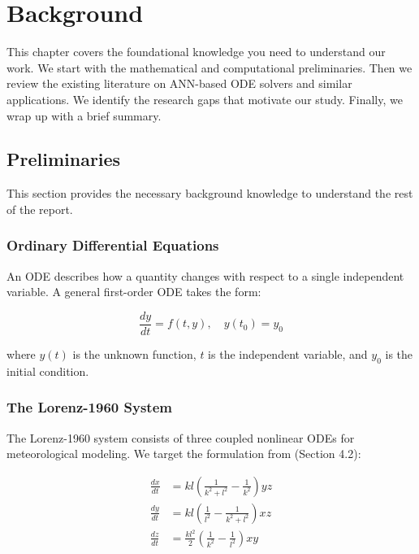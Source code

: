\chapter{Background}

This chapter covers the foundational knowledge you need to understand our work. We start with the mathematical and computational preliminaries. Then we review the existing literature on ANN-based ODE solvers and similar applications. We identify the research gaps that motivate our study. Finally, we wrap up with a brief summary.

\section{Preliminaries}

This section provides the necessary background knowledge to understand the rest of the report.

\subsection{Ordinary Differential Equations}

An ODE describes how a quantity changes with respect to a single independent variable. A general first-order ODE takes the form:

\begin{equation}
\frac{dy}{dt} = f(t, y), \quad y(t_0) = y_0
\label{eq:first_order_ode}
\end{equation}

where $y(t)$ is the unknown function, $t$ is the independent variable, and $y_0$ is the initial condition.

\subsection{The Lorenz-1960 System}

The Lorenz-1960 system \cite{lorenz1960max} consists of three coupled nonlinear ODEs for meteorological modeling. We target the formulation from \cite{matthews2024pinnde} (Section 4.2):

\begin{equation}
\begin{aligned}
\frac{dx}{dt} &= kl\left(\frac{1}{k^2 + l^2} - \frac{1}{k^2}\right) yz \\
\frac{dy}{dt} &= kl\left(\frac{1}{l^2} - \frac{1}{k^2 + l^2}\right) xz \\
\frac{dz}{dt} &= \frac{kl^2}{2}\left(\frac{1}{k^2} - \frac{1}{l^2}\right) xy
\end{aligned}
\label{eq:lorenz1960}
\end{equation}

